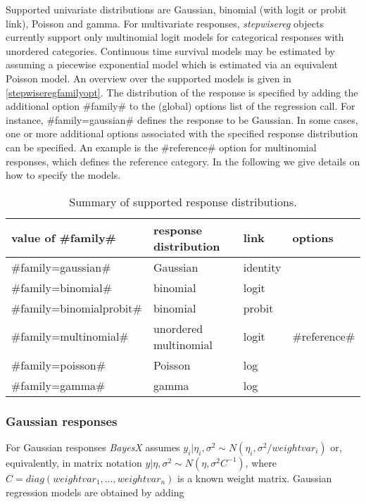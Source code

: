 Supported univariate distributions are Gaussian, binomial (with
logit or probit link), Poisson and gamma. For
multivariate responses, {\em stepwisereg} objects currently support only
multinomial logit models for categorical responses with unordered categories.
Continuous time survival models may be estimated by assuming a piecewise exponential model which
is estimated via an equivalent Poisson model.
An overview over
the supported models is given in \autoref{stepwiseregfamilyopt}. The
distribution of the response is specified by adding the additional
option #family# to the (global) options list of the regression call.
For instance, #family=gaussian# defines the response to be Gaussian.
In some cases, one or more additional options
associated with the specified response distribution can be
specified. An example is the #reference# option for multinomial
responses, which defines the reference category. In the following we
give details on how to specify the models.

\begin{table}[ht]
\begin{center}
\begin{tabular} {|l|p{5cm}|p{2.7cm}|p{1.7cm}|}
 \hline
 value of #family# & response distribution & link & options \\
 \hline
 \hline
 #family=gaussian#            & Gaussian              & identity & \\
 \hline
 #family=binomial#            & binomial              & logit & \\
 #family=binomialprobit#      & binomial              & probit & \\
 \hline
 #family=multinomial#         & unordered multinomial & logit & #reference#\\
 \hline
 #family=poisson#             & Poisson               & log & \\
 #family=gamma#               & gamma               & log & \\
\hline
\end{tabular}
{\em \caption {\label{stepwiseregfamilyopt} Summary of supported response distributions.}}
\end{center}
\end{table}

\subsubsection*{Gaussian responses}

For Gaussian responses {\em BayesX} assumes $y_i | \eta_i,\sigma^2
\sim N(\eta_i,\sigma^2/weightvar_i)$ or, equivalently, in matrix
notation $y | \eta, \sigma^2 \sim N(\eta,\sigma^2C^{-1})$, where
$C=diag(weightvar_1,\dots,weightvar_n)$ is a known weight matrix.
Gaussian regression models are obtained by adding

